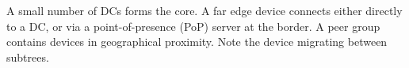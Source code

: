 A small number of DCs forms the core.  A far edge device connects either directly to a DC, or via a point-of-presence (PoP) server at the border.  A peer group contains devices in geographical proximity.  Note the device migrating between subtrees.